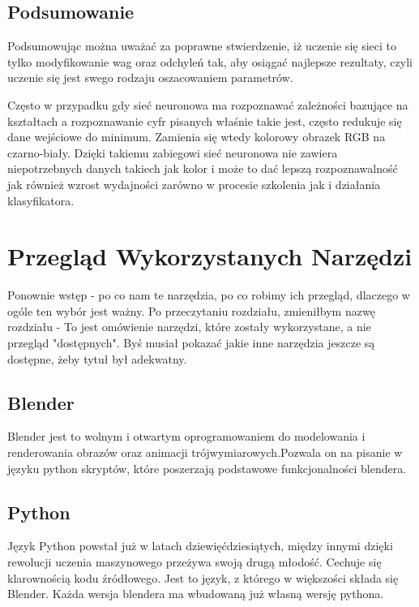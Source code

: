 \documentclass[brudnopis]{xmgr}
\begin{document}
 \section{Podsumowanie \label{s:dsssl}}
 
Podsumowując można uważać za  poprawne stwierdzenie, iż uczenie się sieci to tylko modyfikowanie wag oraz odchyleń tak, aby osiągać najlepsze rezultaty, czyli uczenie się jest swego rodzaju oszacowaniem parametrów.   

Często w przypadku gdy sieć neuronowa ma rozpoznawać zależności bazujące na kształtach a rozpoznawanie cyfr pisanych właśnie takie jest, często redukuje się dane wejściowe do minimum. Zamienia się wtedy kolorowy obrazek RGB na czarno-biały. Dzięki takiemu zabiegowi sieć neuronowa nie zawiera  niepotrzebnych danych takiech jak kolor i może to dać lepszą rozpoznawalność jak również wzrost wydajności zarówno w procesie szkolenia jak i działania klasyfikatora.  


\chapter{Przegląd Wykorzystanych Narzędzi}

Ponownie wstęp - po co nam te narzędzia, po co robimy ich przegląd, dlaczego w ogóle ten wybór jest ważny. Po przeczytaniu rozdziału, zmieniłbym nazwę rozdziału - To jest omówienie narzędzi, które zostały wykorzystane, a nie przegląd "dostępnych". Byś musiał pokazać jakie inne narzędzia jeszcze są dostępne, żeby tytuł był adekwatny.

\section{Blender\label{s:dsssl}}

Blender jest to wolnym i otwartym oprogramowaniem do modelowania i renderowania obrazów oraz animacji trójwymiarowych.Pozwala on na pisanie w języku python skryptów, które poszerzają podstawowe funkcjonalności blendera.

\section{Python\label{s:dsssl}}

Język Python powstał już w latach dziewięćdziesiątych, między innymi dzięki rewolucji uczenia maszynowego przeżywa swoją drugą młodość. Cechuje się klarownością kodu źródłowego.
Jest to język, z którego w większości składa się Blender. Każda wersja blendera ma wbudowaną już własną wersję pythona. 
\end{document}
